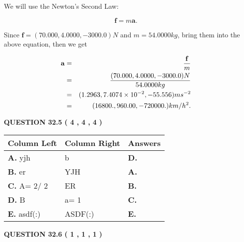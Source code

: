 \documentclass[12pt]{article}
\begin{document}
We will use the Newton's Second Law:
 
\[
\mathbf{f}=m\mathbf{a}.
\]
 
Since $\mathbf{f}=( %
70.000,  %
4.0000,  %
-3000.0 )N$
and $m= %
54.0000kg$, bring them into the above equation, then we get
 
\begin{eqnarray*}
\mathbf{a}&=&\frac{\mathbf{f}}m  \\
&=&\frac{(
70.000 ,
4.0000 ,
-3000.0 )N
}{ %
54.0000 kg}  \\
&=&(
1.2963 ,
7.4074 \times 10^{-2},
-55.556
)ms^{-2} \\
&=&(
16800. ,
960.00 ,
-720000.
)km/h^2.
\end{eqnarray*}
 
 
 
  
\vspace{0.2in}
  
{\textbf{\Large{QUESTION
32.5 
 (           4 ,           4 ,           4 )
}}}
  
  
 
 
\noindent{}
  
  
\begin{tabular}{|l|l|l|}
 \hline
 Column Left & Column Right  & Answers       \\ 
 \hline
{\textbf{\large{
A.}}}
yjh
  & 
b
 & 
{\textbf{\large{
D.}}}
 \\ 
 \hline
{\textbf{\large{
B.}}}
er
  & 
YJH
 & 
{\textbf{\large{
A.}}}
 \\ 
 \hline
{\textbf{\large{
C.}}}
 A= %
2/ %
2

  & 
ER
 & 
{\textbf{\large{
B.}}}
 \\ 
 \hline
{\textbf{\large{
D.}}}
B
  & 
 a= %
1
 & 
{\textbf{\large{
C.}}}
 \\ 
 \hline
{\textbf{\large{
E.}}}
asdf(:)
  & 
ASDF(:)
 & 
{\textbf{\large{
E.}}}
 \\ 
 \hline
 \end{tabular}
  
  
 
 
 
 
  
\vspace{0.2in}
  
{\textbf{\Large{QUESTION
32.6 
 (           1 ,           1 ,           1 )
}}}
  
  


 
 
\end{document}
